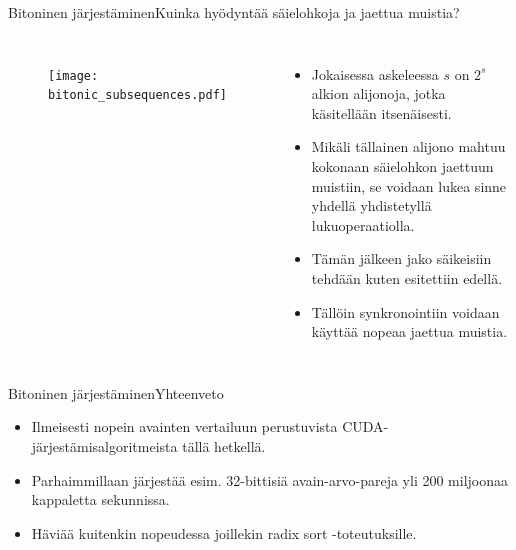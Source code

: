 \documentclass{beamer}
\begin{document}
\begin{frame}{Bitoninen järjestäminen}{Kuinka hyödyntää säielohkoja ja jaettua muistia?}
\begin{columns}
    \begin{figure}
        \texttt{[image: bitonic\_subsequences.pdf]}
    \end{figure}
    \begin{itemize}
      \item
        Jokaisessa askeleessa $s$ on $2^s$ alkion alijonoja, jotka käsitellään itsenäisesti.
      \item
        Mikäli tällainen alijono mahtuu kokonaan säielohkon jaettuun muistiin, se voidaan lukea sinne yhdellä yhdistetyllä lukuoperaatiolla.
      \item
        Tämän jälkeen jako säikeisiin tehdään kuten esitettiin edellä.
      \item
        Tällöin synkronointiin voidaan käyttää nopeaa jaettua muistia.
    \end{itemize}
\end{columns}
\end{frame}

\begin{frame}{Bitoninen järjestäminen}{Yhteenveto}
    \begin{itemize}
      \item
        Ilmeisesti nopein avainten vertailuun perustuvista CUDA-järjestämisalgoritmeista tällä hetkellä.
      \item
        Parhaimmillaan järjestää esim. 32-bittisiä avain-arvo-pareja yli 200 miljoonaa kappaletta sekunnissa.
      \item
        Häviää kuitenkin nopeudessa joillekin radix sort -toteutuksille.
    \end{itemize}
\end{frame}
\end{document}

